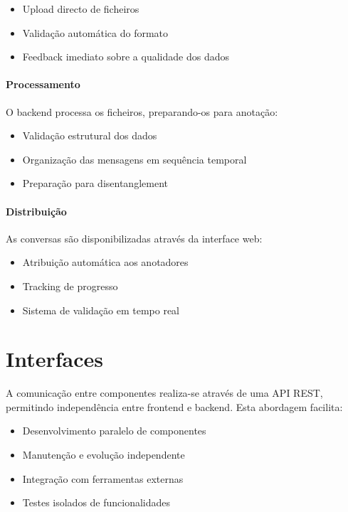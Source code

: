 \begin{itemize}
    \item Upload directo de ficheiros
    \item Validação automática do formato
    \item Feedback imediato sobre a qualidade dos dados
\end{itemize}

\paragraph{Processamento}
O backend processa os ficheiros, preparando-os para anotação:

\begin{itemize}
    \item Validação estrutural dos dados
    \item Organização das mensagens em sequência temporal
    \item Preparação para disentanglement
\end{itemize}

\paragraph{Distribuição}
As conversas são disponibilizadas através da interface web:

\begin{itemize}
    \item Atribuição automática aos anotadores
    \item Tracking de progresso
    \item Sistema de validação em tempo real
\end{itemize}

\section{Interfaces}

A comunicação entre componentes realiza-se através de uma API REST, permitindo independência entre frontend e backend. Esta abordagem facilita:

\begin{itemize}
    \item Desenvolvimento paralelo de componentes
    \item Manutenção e evolução independente
    \item Integração com ferramentas externas
    \item Testes isolados de funcionalidades
\end{itemize}

